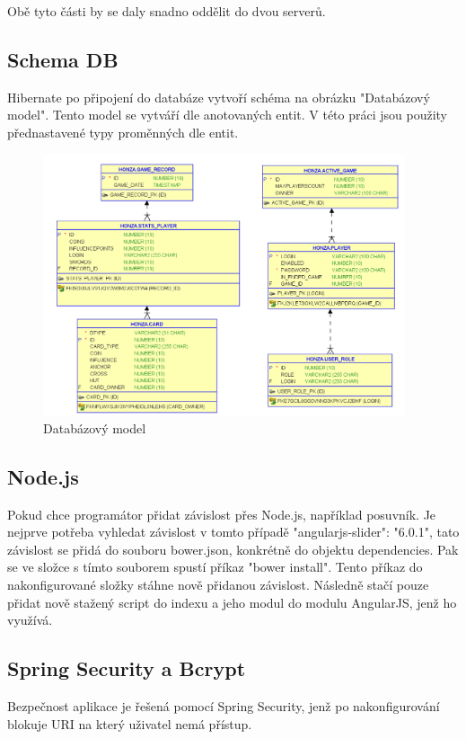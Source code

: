\documentclass[czech,master,public,dept460,male,cpdeclaration,twoside]{diploma}
\begin{document}
Obě tyto části by se daly snadno oddělit do dvou serverů.

\subsection{Schema DB}
Hibernate po připojení do databáze vytvoří schéma na obrázku "Databázový model". Tento model se vytváří dle anotovaných entit. V této práci jsou použity přednastavené typy proměnných dle entit.
\\
\begin{figure}[H]
\centering\includegraphics[width=0.95\textwidth]{Figures/DBmodel.png}\caption{Databázový model}
\end{figure}

\subsection{Node.js}
Pokud chce programátor přidat závislost přes Node.js, například posuvník. Je nejprve potřeba vyhledat závislost v tomto případě "angularjs-slider": "6.0.1", tato závislost se přidá do souboru bower.json, konkrétně do objektu dependencies. Pak se ve složce s tímto souborem spustí příkaz "bower install". Tento příkaz do nakonfigurované složky stáhne nově přidanou závislost. Následně stačí pouze přidat nově stažený script do indexu a jeho modul do modulu AngularJS, jenž ho využívá. 

\subsection{Spring Security a Bcrypt}
Bezpečnost aplikace je řešená pomocí Spring Security, jenž po nakonfigurování blokuje URI na který uživatel nemá přístup.
\end{document}

